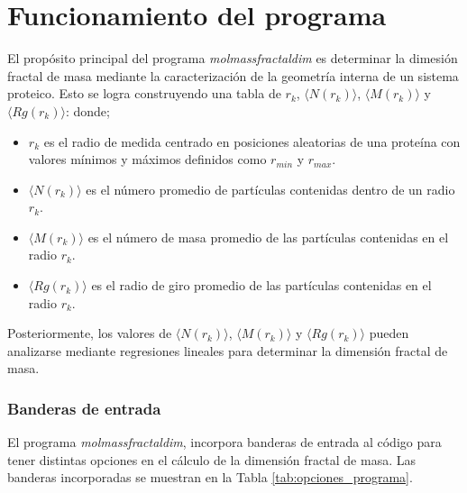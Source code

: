 \chapter{Funcionamiento del programa}

\color{blue}

El propósito principal del programa \textit{molmassfractaldim} es determinar la dimesi\'{o}n fractal de masa mediante la caracterizaci\'{o}n de la geometría interna de un sistema proteico. Esto se logra construyendo una tabla de $r_{k}$, $\langle N(r_k) \rangle$, $\langle M(r_k) \rangle$ y $\langle Rg(r_k) \rangle$: donde;

\begin{itemize}
	\item $r_{k}$ es el radio de medida centrado en posiciones aleatorias de una prote\'{i}na con valores m\'{i}nimos y m\'{a}ximos definidos como $r_{min}$ y $r_{max}$.
	\item $\langle N(r_k) \rangle$ es el número promedio de partículas contenidas dentro de un radio $r_{k}$. 
	\item  $\langle M(r_k) \rangle$ es el n\'{u}mero de masa promedio de las part\'{i}culas contenidas en el radio $r_{k}$.
	\item  $\langle Rg(r_k) \rangle$ es el radio de giro promedio de las part\'{i}culas contenidas en el radio $r_{k}$.
\end{itemize}

Posteriormente, los valores de $\langle N(r_k) \rangle$, $\langle M(r_k) \rangle$ y $\langle Rg(r_k) \rangle$ pueden analizarse mediante regresiones lineales para determinar la dimensi\'{o}n fractal de masa.


	\clearpage

\subsection*{Banderas de entrada}

	El programa \emph{molmassfractaldim}, incorpora banderas de entrada al c\'{o}digo para tener distintas opciones en el c\'{a}lculo de la dimensi\'{o}n fractal de masa. Las banderas incorporadas se muestran en la Tabla \ref{tab:opciones_programa}.
	
